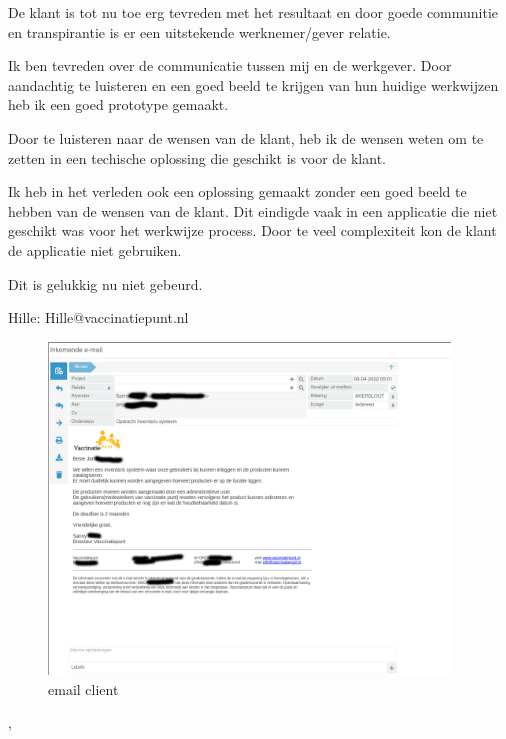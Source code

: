 {{{			De klant is tot nu toe erg tevreden met het resultaat en door goede communitie en transpirantie is er een uitstekende werknemer/gever relatie.
		}
		{%
			Ik ben tevreden over de communicatie tussen mij en de werkgever.
			Door aandachtig te luisteren en een goed beeld te krijgen van hun huidige werkwijzen heb ik een goed prototype gemaakt.

			Door te luisteren naar de wensen van de klant, heb ik de wensen weten om te zetten in een techische oplossing die geschikt is voor de klant.

			Ik heb in het verleden ook een oplossing gemaakt zonder een goed beeld te hebben van de wensen van de klant.
			Dit eindigde vaak in een applicatie die niet geschikt was voor het werkwijze process.
			Door te veel complexiteit kon de klant de applicatie niet gebruiken.

			Dit is gelukkig nu niet gebeurd.
		}
		{
			Hille: Hille@vaccinatiepunt.nl
		}
	}
	{%

		\begin{figure}
			\begin{center}
				\includegraphics[width=0.95\textwidth]{images/email.png}
			\end{center}
			\caption{email client}
			\label{fig:emailclient}
		\end{figure}
	},
}
